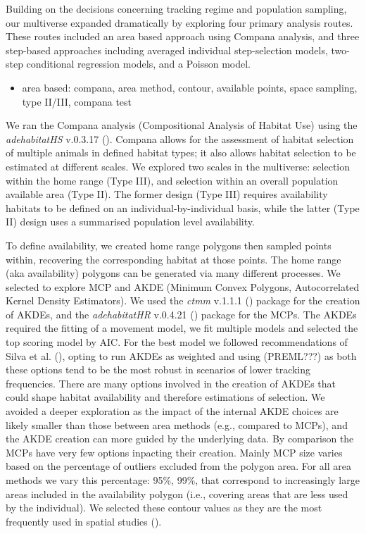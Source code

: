 \documentclass[10pt,a4paper]{article}
\providecommand{\tightlist}{%
  \setlength{\itemsep}{0pt}\setlength{\parskip}{0pt}}
\begin{document}
Building on the decisions concerning tracking regime and population sampling, our multiverse expanded dramatically by exploring four primary analysis routes.
These routes included an area based approach using Compana analysis, and three step-based approaches including averaged individual step-selection models, two-step conditional regression models, and a Poisson model.

\begin{itemize}
\tightlist
\item
  area based: compana, area method, contour, available points, space sampling, type II/III, compana test
\end{itemize}

We ran the Compana analysis (Compositional Analysis of Habitat Use) using the \emph{adehabitatHS} v.0.3.17 ().
Compana allows for the assessment of habitat selection of multiple animals in defined habitat types; it also allows habitat selection to be estimated at different scales.
We explored two scales in the multiverse: selection within the home range (Type III), and selection within an overall population available area (Type II).
The former design (Type III) requires availability habitats to be defined on an individual-by-individual basis, while the latter (Type II) design uses a summarised population level availability.

To define availability, we created home range polygons then sampled points within, recovering the corresponding habitat at those points.
The home range (aka availability) polygons can be generated via many different processes.
We selected to explore MCP and AKDE (Minimum Convex Polygons, Autocorrelated Kernel Density Estimators).
We used the \emph{ctmm} v.1.1.1 () package for the creation of AKDEs, and the \emph{adehabitatHR} v.0.4.21 () package for the MCPs.
The AKDEs required the fitting of a movement model, we fit multiple models and selected the top scoring model by AIC.
For the best model we followed recommendations of Silva et al. (), opting to run AKDEs as weighted and using (PREML???) as both these options tend to be the most robust in scenarios of lower tracking frequencies.
There are many options involved in the creation of AKDEs that could shape habitat availability and therefore estimations of selection.
We avoided a deeper exploration as the impact of the internal AKDE choices are likely smaller than those between area methods (e.g., compared to MCPs), and the AKDE creation can more guided by the underlying data.
By comparison the MCPs have very few options inpacting their creation.
Mainly MCP size varies based on the percentage of outliers excluded from the polygon area.
For all area methods we vary this percentage: 95\%, 99\%, that correspond to increasingly large areas included in the availability polygon (i.e., covering areas that are less used by the individual).
We selected these contour values as they are the most frequently used in spatial studies ().
\end{document}

